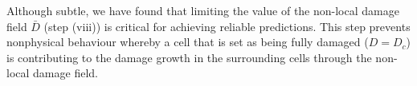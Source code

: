 \documentclass[sn-mathphys,Numbered]{sn-jnl}%
\begin{document}
Although subtle, we have found that limiting the value of the non-local damage field $\bar{D}$ (step (viii)) is critical for achieving reliable predictions.
This step prevents nonphysical behaviour whereby a cell that is set as being fully damaged ($D = D_c$) is contributing to the damage growth in the surrounding cells through the non-local damage field.

%
%
%
\end{document}
